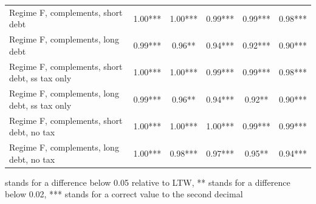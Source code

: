 \documentclass[letterpaper,12pt]{article}%
\begin{document}
\begin{table}[H]
\begin{threeparttable}
\begin{tabular}{l c c c c c}
     \quad Regime F, complements, short debt &  1.00*** &  1.00*** & 0.99***  & 0.99*** & 0.98***  \\
     \quad Regime F, complements, long debt &  0.99*** & 0.96**  & 0.94*** & 0.92***  &  0.90*** \\
     \quad Regime F, complements, short debt, ss tax only &  1.00*** &  1.00*** &  0.99*** & 0.99*** & 0.98*** \\
     \quad Regime F, complements, long debt, ss tax only &  0.99***  & 0.96** & 0.94*** & 0.92**  & 0.90*** \\
     \quad Regime F, complements, short debt, no tax &  1.00*** & 1.00*** &  1.00*** & 0.99*** & 0.99*** \\
     \quad Regime F, complements, long debt, no tax &    1.00***  & 0.98***  & 0.97*** & 0.95** & 0.94*** \\
    \bottomrule    
    \end{tabular}
    \begin{tablenotes}
    \item * stands for a difference below 0.05 relative to LTW, ** stands for a difference below 0.02, *** stands for a correct value to the second decimal
    \end{tablenotes}
    \label{tab:my_label}
    \end{threeparttable}
\end{table}
\end{document}
